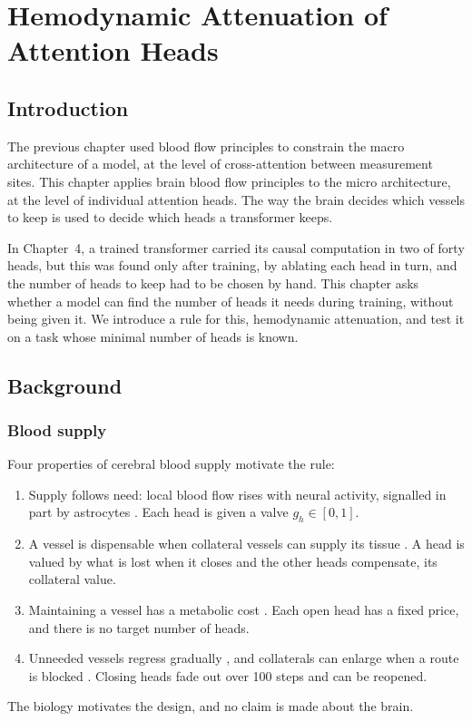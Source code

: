 \documentclass[11pt]{report}
\begin{document}
\setcounter{chapter}{5}
\chapter{Hemodynamic Attenuation of Attention Heads}
\label{ch:hemo}

\section{Introduction}

The previous chapter used blood flow principles to constrain the macro architecture of a
model, at the level of cross-attention between measurement sites. This chapter applies brain
blood flow principles to the micro architecture, at the level of individual attention heads. The
way the brain decides which vessels to keep is used to decide which heads a transformer keeps.

In Chapter~4, a trained transformer carried its causal computation in two of forty heads, but
this was found only after training, by ablating each head in turn, and the number of heads to
keep had to be chosen by hand. This chapter asks whether a model can find the number of heads it
needs during training, without being given it. We introduce a rule for this, hemodynamic
attenuation, and test it on a task whose minimal number of heads is known.

\section{Background}

\subsection{Blood supply}

Four properties of cerebral blood supply motivate the rule:
\begin{enumerate}
\item Supply follows need: local blood flow rises with neural activity, signalled in part by
      astrocytes \cite{attwell2010}. Each head is given a valve $g_h \in [0,1]$.
\item A vessel is dispensable when collateral vessels can supply its tissue \cite{faber2014}.
      A head is valued by what is lost when it closes and the other heads compensate, its
      collateral value.
\item Maintaining a vessel has a metabolic cost \cite{murray1926}. Each open head has a fixed
      price, and there is no target number of heads.
\item Unneeded vessels regress gradually \cite{chen2012,franco2015}, and collaterals can enlarge
      when a route is blocked \cite{faber2014}. Closing heads fade out over 100 steps and can
      be reopened.
\end{enumerate}
The biology motivates the design, and no claim is made about the brain.
\end{document}
